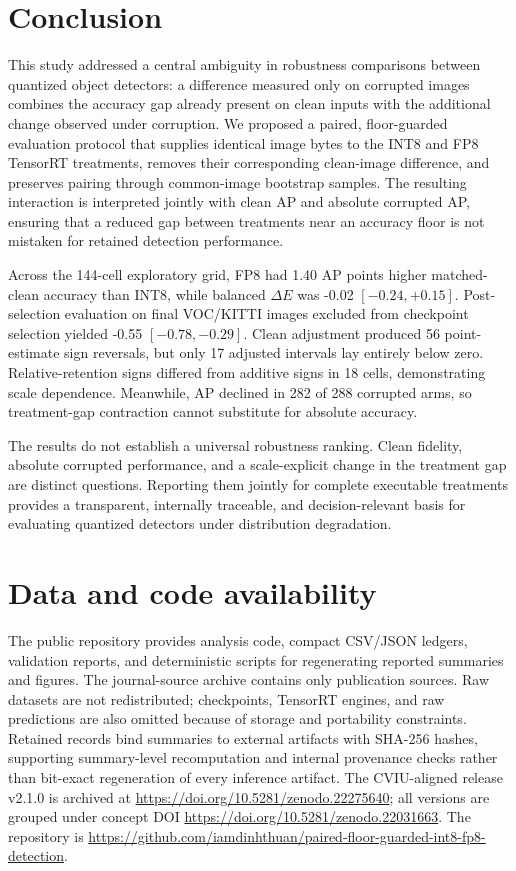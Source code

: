 \documentclass[a4paper,fleqn]{cas-dc}
\begin{document}
\section{Conclusion}
\label{sec:conclusion}

This study addressed a central ambiguity in robustness comparisons between quantized object detectors: a difference measured only on corrupted images combines the accuracy gap already present on clean inputs with the additional change observed under corruption. We proposed a paired, floor-guarded evaluation protocol that supplies identical image bytes to the INT8 and FP8 TensorRT treatments, removes their corresponding clean-image difference, and preserves pairing through common-image bootstrap samples. The resulting interaction is interpreted jointly with clean AP and absolute corrupted AP, ensuring that a reduced gap between treatments near an accuracy floor is not mistaken for retained detection performance.

Across the 144-cell exploratory grid, FP8 had 1.40 AP points higher matched-clean accuracy than INT8, while balanced $\Delta E$ was -0.02 $[-0.24,+0.15]$. Post-selection evaluation on final VOC/KITTI images excluded from checkpoint selection yielded -0.55 $[-0.78,-0.29]$. Clean adjustment produced 56 point-estimate sign reversals, but only 17 adjusted intervals lay entirely below zero. Relative-retention signs differed from additive signs in 18 cells, demonstrating scale dependence. Meanwhile, AP declined in 282 of 288 corrupted arms, so treatment-gap contraction cannot substitute for absolute accuracy.

The results do not establish a universal robustness ranking. Clean fidelity, absolute corrupted performance, and a scale-explicit change in the treatment gap are distinct questions. Reporting them jointly for complete executable treatments provides a transparent, internally traceable, and decision-relevant basis for evaluating quantized detectors under distribution degradation.

\FloatBarrier
\section*{Data and code availability}

The public repository provides analysis code, compact CSV/JSON ledgers, validation reports, and deterministic scripts for regenerating reported summaries and figures. The journal-source archive contains only publication sources. Raw datasets are not redistributed; checkpoints, TensorRT engines, and raw predictions are also omitted because of storage and portability constraints. Retained records bind summaries to external artifacts with SHA-256 hashes, supporting summary-level recomputation and internal provenance checks rather than bit-exact regeneration of every inference artifact. The CVIU-aligned release v2.1.0 is archived at \url{https://doi.org/10.5281/zenodo.22275640}; all versions are grouped under concept DOI \url{https://doi.org/10.5281/zenodo.22031663}. The repository is \url{https://github.com/iamdinhthuan/paired-floor-guarded-int8-fp8-detection}.
\end{document}
